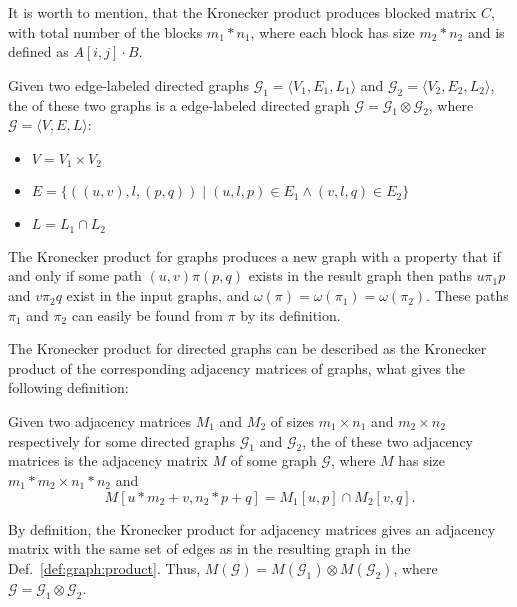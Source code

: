 It is worth to mention, that the Kronecker product produces blocked matrix $C$,
with total number of the blocks $m_1 * n_1$, where each block has size
$m_2 * n_2$ and is defined as $A[i,j] \cdot B$.

\begin{definition}
\label{def:graph:product}
Given two edge-labeled directed graphs $\mathcal{G}_1=\langle V_1, E_1, L_1 \rangle$
and $\mathcal{G}_2=\langle V_2, E_2, L_2 \rangle$,
the  of these two graphs is a edge-labeled directed graph
$\mathcal{G}=\mathcal{G}_1 \otimes \mathcal{G}_2$,
where $\mathcal{G}= \langle V, E, L \rangle$:
\begin{itemize}
    \item $V = V_1 \times V_2$
    \item $E = \{((u,v),l,(p,q)) \mid (u,l,p) \in E_1 \wedge (v,l,q) \in E_2 \}$
    \item $L = L_1 \cap L_2$
\end{itemize}
\end{definition}

The Kronecker product for graphs produces a new graph with a property
that if and only if some path $(u,v)\pi(p,q)$ exists in the result graph
then paths $u\pi_1p$ and $v\pi_2q$ exist in the input graphs,
and $\omega(\pi) = \omega(\pi_1) = \omega(\pi_2)$.
These paths $\pi_1$ and $\pi_2$ can easily be found from $\pi$ by its definition.

The Kronecker product for directed graphs can be described as
the Kronecker product of the corresponding adjacency matrices of graphs,
what gives the following definition:

\begin{definition}
Given two adjacency matrices $M_1$ and $M_2$ of sizes
$m_1 \times n_1$ and $m_2 \times n_2$ respectively
for some directed graphs $\mathcal{G}_1$ and $\mathcal{G}_2$,
the  of these two adjacency matrices is the adjacency matrix $M$
of some graph $\mathcal{G}$, where $M$ has size $m_1 * m_2 \times n_1 * n_2$ and
\[M[u * m_2 + v,n_2 * p + q] = M_1[u,p] \cap M_2[v,q].\]
\end{definition}

By definition, the Kronecker product for adjacency matrices gives an
adjacency matrix with the same set of edges as in the resulting graph in the
Def.~\ref{def:graph:product}. Thus, $M(\mathcal{G}) = M(\mathcal{G}_1) \otimes
M(\mathcal{G}_2)$, where $\mathcal{G} = \mathcal{G}_1 \otimes \mathcal{G}_2$.

